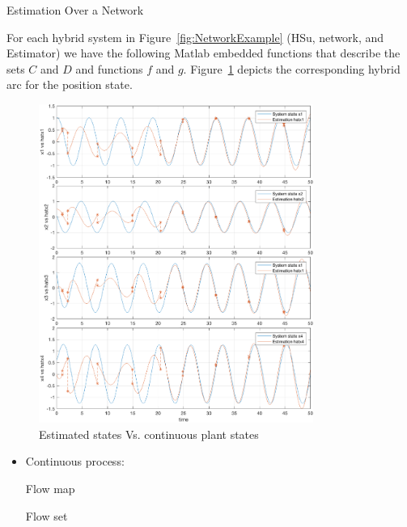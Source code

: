 \begin{example}{Estimation Over a Network}
\begin{itemize}
\end{itemize}



For each hybrid system in Figure~\ref{fig:NetworkExample} (HSu, network, and Estimator) we have the following Matlab embedded functions that describe the sets $C$ and $D$ and functions $f$ and $g$.
Figure~\ref{fig:Net-Est} depicts the corresponding hybrid arc for the position state.

\begin{figure}[ht]
  \begin{center}
    \includegraphics[width=0.8\textwidth]{figures/Simulink/ResultsNetworkEstimator1.eps}
   \caption{Estimated states Vs. continuous plant states}
\label{fig:Net-Est}
  \end{center}
\end{figure}


\begin{itemize}
\item Continuous process:

Flow map
\label{scr:f}

Flow set
\label{scr:C}


\end{itemize}
\end{example}
